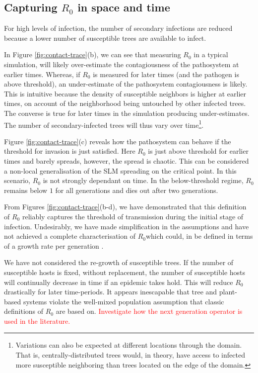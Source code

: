 \subsection{Capturing $R_0$ in space and time}

For high levels of infection, the number of secondary infections are reduced because a lower number of susceptible trees are available to infect. 

In Figure \ref{fig:contact-trace}(b), we can see that measuring $R_0$ in a typical simulation, %
will likely over-estimate the contagiousness of the pathosystem at earlier times. %
Whereas, if $R_0$ is measured for later times (and the pathogen is above threshold), an %
under-estimate of the pathosystem contagiousness is likely. %
This is intuitive because the density of susceptible neighbors is higher at earlier times, %
on account of the neighborhood being untouched by other infected trees. %
The converse is true for later times in the simulation producing under-estimates. %
The number of secondary-infected trees will thus vary over time\footnote{Variations can %
also be expected at different locations through the domain. That is, centrally-distributed %
trees would, in theory, have access to infected more susceptible neighboring than trees %
located on the edge of the domain.}. %

Figure \ref{fig:contact-trace}(c) reveals how the pathosystem can behave if the threshold for %
invasion is just satisfied. %
Here $R_0$ is just above threshold for earlier times and barely spreads, however, the spread is chaotic. %
This can be considered a non-local generalisation of the SLM spreading on the critical point. %
In this scenario, $R_0$ is not strongly dependant on time. %
In the below-threshold regime, $R_0$ remains below $1$ for all generations and dies out after %
two generations. %

From Figures \ref{fig:contact-trace}(b-d), we have demonstrated that this definition of $R_0$ %
reliably captures the threshold of transmission during the initial stage of infection. %
Undesirably, we have made simplification in the assumptions and have not achieved a complete %
characterisation of $R_0$\textemdash which could, in be defined in terms of a growth %
rate per generation \cite{R0-construct}. %

We have not considered the re-growth of susceptible trees. %
If the number of susceptible hosts is fixed, without replacement, the number of susceptible hosts %
will continually decrease in time if an epidemic takes hold. %
This will reduce $R_0$ drastically for later time-periods. %
It appears inescapable that tree and plant-based systems violate the well-mixed population %
assumption that classic definitions of $R_0$ are based on. %
\textcolor{red}{Investigate how the next generation operator is used in the literature.}\\

